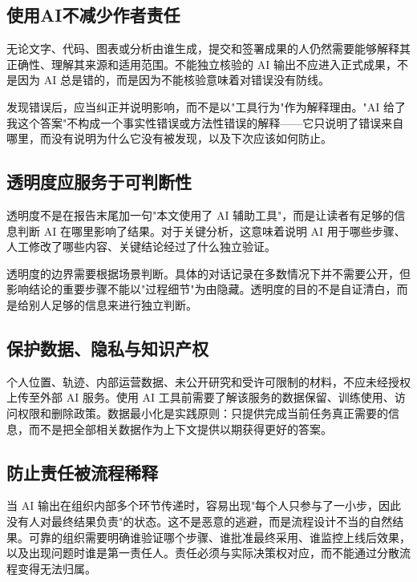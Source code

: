 \subsection{使用AI不减少作者责任}

无论文字、代码、图表或分析由谁生成，提交和签署成果的人仍然需要能够解释其正确性、理解其来源和适用范围。不能独立核验的 AI 输出不应进入正式成果，不是因为 AI 总是错的，而是因为不能核验意味着对错误没有防线。

发现错误后，应当纠正并说明影响，而不是以"工具行为"作为解释理由。"AI 给了我这个答案"不构成一个事实性错误或方法性错误的解释——它只说明了错误来自哪里，而没有说明为什么它没有被发现，以及下次应该如何防止。

\subsection{透明度应服务于可判断性}

透明度不是在报告末尾加一句"本文使用了 AI 辅助工具"，而是让读者有足够的信息判断 AI 在哪里影响了结果。对于关键分析，这意味着说明 AI 用于哪些步骤、人工修改了哪些内容、关键结论经过了什么独立验证。

透明度的边界需要根据场景判断。具体的对话记录在多数情况下并不需要公开，但影响结论的重要步骤不能以"过程细节"为由隐藏。透明度的目的不是自证清白，而是给别人足够的信息来进行独立判断。

\subsection{保护数据、隐私与知识产权}

个人位置、轨迹、内部运营数据、未公开研究和受许可限制的材料，不应未经授权上传至外部 AI 服务。使用 AI 工具前需要了解该服务的数据保留、训练使用、访问权限和删除政策。数据最小化是实践原则：只提供完成当前任务真正需要的信息，而不是把全部相关数据作为上下文提供以期获得更好的答案。

\subsection{防止责任被流程稀释}

当 AI 输出在组织内部多个环节传递时，容易出现"每个人只参与了一小步，因此没有人对最终结果负责"的状态。这不是恶意的逃避，而是流程设计不当的自然结果。可靠的组织需要明确谁验证哪个步骤、谁批准最终采用、谁监控上线后效果，以及出现问题时谁是第一责任人。责任必须与实际决策权对应，而不能通过分散流程变得无法归属。

